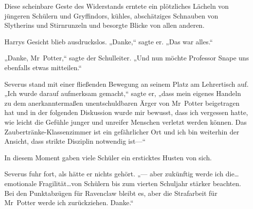 Diese scheinbare Geste des Widerstands erntete ein plötzliches Lächeln von jüngeren Schülern und Gryffindors, kühles, abschätziges Schnauben von Slytherins und Stirnrunzeln und besorgte Blicke von allen anderen.

Harrys Gesicht blieb ausdruckslos. „Danke,“ sagte er. „Das war alles.“

„Danke, Mr~Potter,“ sagte der Schulleiter. „Und nun möchte Professor Snape uns ebenfalls etwas mitteilen.“

Severus stand mit einer fließenden Bewegung an seinem Platz am Lehrertisch auf. „Ich wurde darauf aufmerksam gemacht,“ sagte er, „dass mein eigenes Handeln zu dem anerkanntermaßen unentschuldbaren Ärger von Mr~Potter beigetragen hat und in der folgenden Diskussion wurde mir bewusst, dass ich vergessen hatte, wie leicht die Gefühle junger und unreifer Menschen verletzt werden können. Das Zaubertränke-Klassenzimmer ist ein gefährlicher Ort und ich bin weiterhin der Ansicht, dass strikte Disziplin notwendig ist—“

In diesem Moment gaben viele Schüler ein ersticktes Husten von sich.

Severus fuhr fort, als hätte er nichts gehört. „— aber zukünftig werde ich die…emotionale Fragilität…von Schülern bis zum vierten Schuljahr stärker beachten. Bei den Punktabzügen für Ravenclaw bleibt es, aber die Strafarbeit für Mr~Potter werde ich zurückziehen. Danke.“


